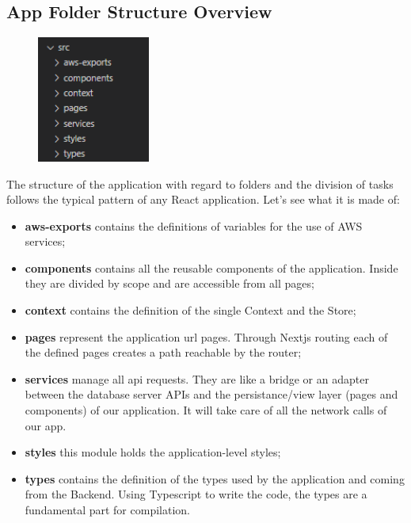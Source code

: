 \subsection{App Folder Structure Overview}

\begin{figure}[H]
    \centering
    \includegraphics[width=10em]{res/images/frontend-diagrams/app-folder-structure.png}
\end{figure}

The structure of the application with regard to folders and the division of tasks follows the typical pattern of any React application. Let's see what it is made of:

\begin{itemize}
    \item \textbf{aws-exports} contains the definitions of variables for the use of AWS services;
    \item \textbf{components} contains all the reusable components of the application. Inside they are divided by scope and are accessible from all pages;
    \item \textbf{context} contains the definition of the single Context and the Store;
    \item \textbf{pages} represent the application url pages. Through Nextjs routing each of the defined pages creates a path reachable by the router;
    \item \textbf{services} manage all api requests. They are like a bridge or an adapter between the database server APIs and the persistance/view layer (pages and components) of our application. It will take care of all the network calls of our app.
    \item \textbf{styles} this module holds the application-level styles;
    \item \textbf{types} contains the definition of the types used by the application and coming from the Backend. Using Typescript to write the code, the types are a fundamental part for compilation.
\end{itemize}